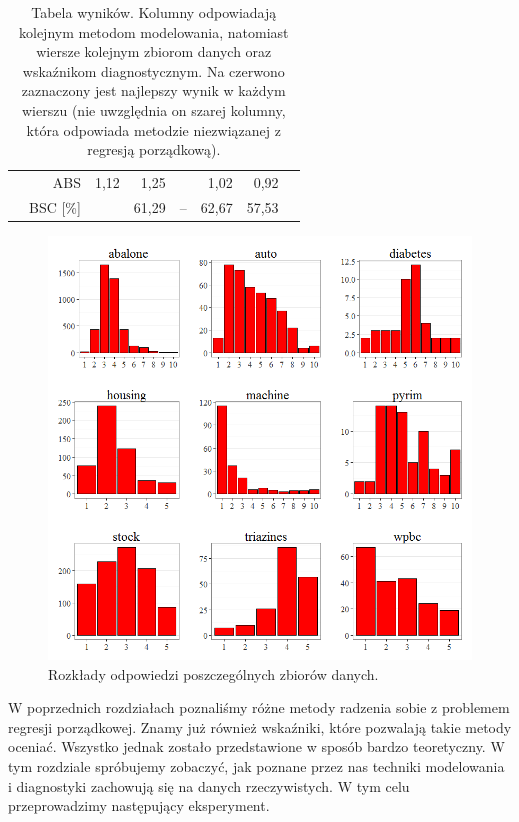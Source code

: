 \documentclass{mini}
\begin{document}
\begin{table}[!htbp]
\begin{tabular}{rrrrrrrr}
   & ABS \color{white}{[\%]} & 1,12 & 1,25 & \color{red}{0,86} & 1,02 & 0,92 &\color{gray}{1,29}\\ 
   & BSC [\%] & \color{red}{67,59} & 61,29 & -- & 62,67 & 57,53 &\color{gray}{40,48}\\ 
   \hline
\end{tabular}
\caption{Tabela wyników. Kolumny odpowiadają kolejnym metodom modelowania, natomiast wiersze kolejnym zbiorom danych oraz wskaźnikom diagnostycznym. Na czerwono zaznaczony jest najlepszy wynik w każdym wierszu (nie uwzględnia on szarej kolumny, która odpowiada metodzie niezwiązanej z regresją porządkową).}
\label{wyniki} 
\end{table}

\begin{figure}[h!]
\begin{center}
\includegraphics[width=\textwidth]{graphics/rozklad_odpowiedzi.png}
\end{center}
\caption{Rozkłady odpowiedzi poszczególnych zbiorów danych.}
\label{rozkladdanych}
\end{figure}

W poprzednich rozdziałach poznaliśmy różne metody radzenia sobie z problemem regresji porządkowej. Znamy już również wskaźniki, które pozwalają takie metody oceniać. Wszystko jednak zostało przedstawione w sposób bardzo teoretyczny. W tym rozdziale spróbujemy zobaczyć, jak poznane przez nas techniki modelowania i diagnostyki zachowują się na danych rzeczywistych. W tym celu przeprowadzimy następujący eksperyment.
\end{document}
